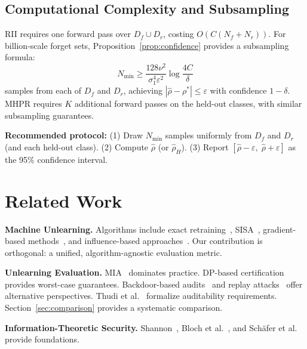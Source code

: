 \documentclass[journal]{IEEEtran}
\theoremstyle{definition}
\begin{document}
\subsection{Computational Complexity and Subsampling}

RII requires one forward pass over $D_f \cup D_r$, costing $O(C(N_f+N_r))$. For billion-scale forget sets, Proposition~\ref{prop:confidence} provides a subsampling formula:
\begin{equation}
\boxed{N_{\min} \ge \frac{128\nu^2}{\sigma_1^4\varepsilon^2}\log\frac{4C}{\delta}}
\end{equation}
samples from each of $D_f$ and $D_r$, achieving $|\hat{\rho}-\rho^*| \le \varepsilon$ with confidence $1-\delta$. MHPR requires $K$ additional forward passes on the held-out classes, with similar subsampling guarantees.

\textbf{Recommended protocol:} (1) Draw $N_{\min}$ samples uniformly from $D_f$ and $D_r$ (and each held-out class). (2) Compute $\hat{\rho}$ (or $\hat{\rho}_H$). (3) Report $[\hat{\rho}-\varepsilon,\;\hat{\rho}+\varepsilon]$ as the 95\% confidence interval.

\section{Related Work}
\label{sec:related}

\textbf{Machine Unlearning.} Algorithms include exact retraining~\cite{cao2015towards}, SISA~\cite{bourtoule2021machine}, gradient-based methods~\cite{golatkar2020eternal,sekhari2021remember}, and influence-based approaches~\cite{guo2020certified}. Our contribution is orthogonal: a unified, algorithm-agnostic evaluation metric.

\textbf{Unlearning Evaluation.} MIA~\cite{shokri2017membership,carlini2022membership} dominates practice. DP-based certification~\cite{guo2020certified,ginart2019making} provides worst-case guarantees. Backdoor-based audits~\cite{sommer2022towards} and replay attacks~\cite{chen2021when} offer alternative perspectives. Thudi et al.~\cite{thudi2022necessity} formalize auditability requirements. Section~\ref{sec:comparison} provides a systematic comparison.

\textbf{Information-Theoretic Security.} Shannon~\cite{shannon1949communication}, Bloch et al.~\cite{bloch2021overview}, and Sch\"{a}fer et al.~\cite{schafer2021_info_theoretic} provide foundations.
\end{document}
